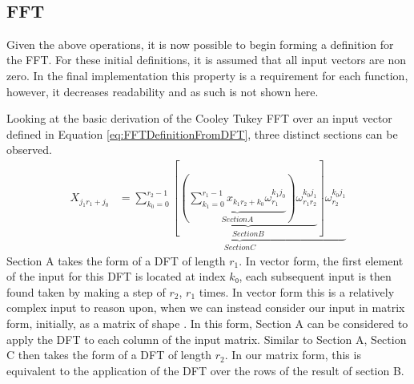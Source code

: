 \begin{code}
\AgdaSpace{}%
\AgdaSymbol{)}\AgdaSpace{}%
\AgdaSpace{}%
\AgdaSpace{}%
\AgdaSpace{}%
\AgdaSymbol{(}\AgdaSpace{}%
\AgdaSpace{}%
\AgdaSymbol{)}\AgdaSpace{}%
\<%
\\
%
\>[2]\AgdaSpace{}%
\AgdaSpace{}%
\AgdaSpace{}%
\AgdaSymbol{=}\AgdaSpace{}%
\AgdaSpace{}%
\AgdaSymbol{(}\AgdaSpace{}%
\AgdaSpace{}%
\AgdaSymbol{(}\AgdaSpace{}%
\AgdaSymbol{))}\<%
\end{code}


\clearpage
\subsection{FFT}
Given the above operations, it is now possible to begin forming a definition for
the FFT.
For these initial definitions, it is assumed that all input vectors are non zero.
In the final implementation this property is a requirement for each function,
however, it decreases readability and as such is not shown here.

Looking at the basic derivation of the Cooley Tukey FFT over an input vector
defined in Equation \ref{eq:FFTDefinitionFromDFT}, three distinct sections can
be observed.
\begin{align}
    X_{j_1r_1+j_0}
      &=\underbrace{\sum^{r_2-1}_{k_0=0}{
        \left[
          \underbrace{
            \left(
              \underbrace{
                \sum^{r_1-1}_{k_1=0}x_{k_1r_2+k_0}\omega_{r_1}^{k_1j_0}
              }_{Section A} \right
            ) \omega_{r_1r_2}^{k_0j_1}
          }_{Section B}
        \right]
        \omega_{r_2}^{k_0j_1}
      }}_{Section C}
    \label{eq:FFTDefinitionLabeled}
\end{align}
Section A takes the form of a DFT of length $r_1$.
In vector form, the first element of the input for this DFT is located at index $k₀$, 
each subsequent input is then found taken by making a step of $r_2$, $r_1$ times.
In vector form this is a relatively complex input to reason upon, when we can 
instead consider our input in matrix form, initially, as a matrix of shape .
In this form, Section A can be considered to apply the DFT to each column of the
input matrix.
Similar to Section A, Section C then takes the form of a DFT of length $r_2$.
In our  matrix form, this is equivalent to the application of 
the DFT over the rows of the result of section B.

